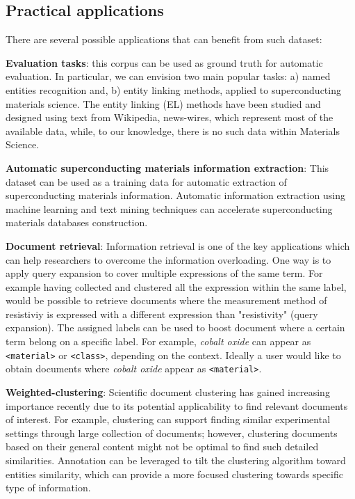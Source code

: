 \documentclass[fleqn,10pt]{wlscirep}
\begin{document}
\subsection*{Practical applications}
There are several possible applications that can benefit from such dataset:

\textbf{Evaluation tasks}: this corpus can be used as ground truth for automatic evaluation. In particular, we can envision two main popular tasks: a) named entities recognition  and, b) entity linking methods, applied to superconducting materials science.
The entity linking (EL) methods have been studied and designed using text from Wikipedia, news-wires, which represent most of the available data, while, to our knowledge, there is no such data within Materials Science.

\textbf{Automatic superconducting materials information extraction}: This dataset can be used as a training data for automatic extraction of superconducting materials information. Automatic information extraction using machine learning and text mining techniques can accelerate superconducting materials databases construction.

\textbf{Document retrieval}: Information retrieval is one of the key applications which can help researchers to overcome the information overloading.
One way is to apply query expansion to cover multiple expressions of the same term. 
For example having collected and clustered all the expression within the same label, would be possible to retrieve documents where the measurement method of resistiviy is expressed with a different expression than "resistivity" (query expansion).
The assigned labels can be used to boost document where a certain term belong on a specific label. For example, \textit{cobalt oxide} can appear as \texttt{<material>} or \texttt{<class>}, depending on the context. Ideally a user would like to obtain documents where \textit{cobalt oxide} appear as \texttt{<material>}.

\textbf{Weighted-clustering}: Scientific document clustering has gained increasing importance recently due to its potential applicability to find relevant documents of interest. 
For example, clustering can support finding similar experimental settings through large collection of documents; however, clustering documents based on their general content might not be optimal to find such detailed similarities. 
Annotation can be leveraged to tilt the clustering algorithm toward entities similarity, which can provide a more focused clustering towards specific type of information.
\end{document}
